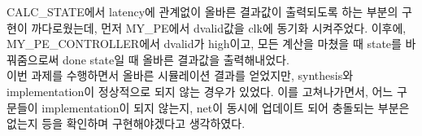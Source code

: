 \documentclass{article}
\begin{document}
CALC\_STATE에서 latency에 관계없이 올바른 결과값이 출력되도록 하는 부분의 구현이 까다로웠는데, 먼저 MY\_PE에서 dvalid값을 clk에 동기화 시켜주었다. 이후에, MY\_PE\_CONTROLLER에서 dvalid가 high이고, 모든 계산을 마쳤을 때 state를 바꿔줌으로써 done state일 때 올바른 결과값을 출력해내었다.\\

이번 과제를 수행하면서 올바른 시뮬레이션 결과를 얻었지만, synthesis와 implementation이 정상적으로 되지 않는 경우가 있었다. 이를 고쳐나가면서, 어느 구문들이 implementation이 되지 않는지, net이 동시에 업데이트 되어 충돌되는 부분은 없는지 등을 확인하며 구현해야겠다고 생각하였다.\\



\end{document}
